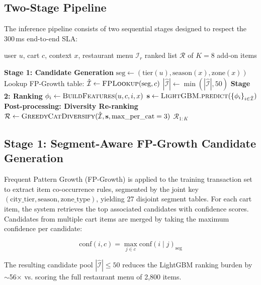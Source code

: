 \documentclass[conference]{IEEEtran}
\begin{document}
\subsection{Two-Stage Pipeline}

The inference pipeline consists of two sequential stages designed to respect
the 300\,ms end-to-end SLA:

\begin{algorithm}
\caption{CSAO Inference Pipeline}
\begin{algorithmic}[1]
\REQUIRE user $u$, cart $c$, context $x$, restaurant menu $\mathcal{I}_r$
\ENSURE ranked list $\mathcal{R}$ of $K=8$ add-on items

\STATE \textbf{Stage 1: Candidate Generation}
\STATE $\text{seg} \leftarrow (\text{tier}(u), \text{season}(x), \text{zone}(x))$
\STATE Lookup FP-Growth table: $\hat{\mathcal{I}} \leftarrow \textsc{FPLookup}(\text{seg}, c)$
\STATE $|\hat{\mathcal{I}}| \leftarrow \min(|\hat{\mathcal{I}}|, 50)$
\STATE \textbf{Stage 2: Ranking}
  \STATE $\phi_i \leftarrow \textsc{BuildFeatures}(u, c, i, x)$
\ENDFOR
\STATE $\mathbf{s} \leftarrow \textsc{LightGBM.predict}(\{{\phi_i}\}_{i \in \hat{\mathcal{I}}})$
\STATE \textbf{Post-processing: Diversity Re-ranking}
\STATE $\mathcal{R} \leftarrow \textsc{GreedyCatDiversify}(\hat{\mathcal{I}}, \mathbf{s}, \text{max\_per\_cat}=3)$
\RETURN $\mathcal{R}_{1:K}$
\end{algorithmic}
\end{algorithm}

\subsection{Stage 1: Segment-Aware FP-Growth Candidate Generation}

Frequent Pattern Growth (FP-Growth) is applied to the
training transaction set to extract item co-occurrence rules, segmented by
the joint key $(\text{city\_tier}, \text{season}, \text{zone\_type})$, yielding
27 disjoint segment tables. For each cart item, the system retrieves the top
associated candidates with confidence scores. Candidates from multiple cart
items are merged by taking the maximum confidence per candidate:

\begin{equation}
  \text{conf}(i, c) = \max_{j \in c} \text{conf}(i \mid j)_\text{seg}
\end{equation}

The resulting candidate pool $|\hat{\mathcal{I}}| \leq 50$ reduces the
LightGBM ranking burden by $\sim$56$\times$ vs. scoring the full restaurant
menu of 2,800 items.
\end{document}
